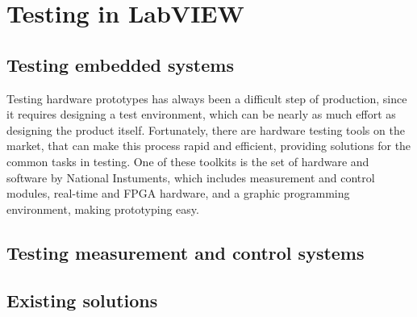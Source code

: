 \chapter{Testing in LabVIEW}


\section{Testing embedded systems}
Testing hardware prototypes has always been a difficult step of production, since it requires designing a test environment, which can be nearly as much effort as designing the product itself. Fortunately, there are hardware testing tools on the market, that can make this process rapid and efficient, providing solutions for the common tasks in testing. One of these toolkits is the set of hardware and software by National Instuments, which includes measurement and control modules, real-time and FPGA hardware, and a graphic programming environment, making prototyping easy.
\section{Testing measurement and control systems}
\section{Existing solutions}